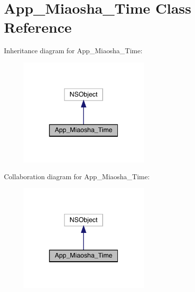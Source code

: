 \hypertarget{interface_app___miaosha___time}{}\section{App\+\_\+\+Miaosha\+\_\+\+Time Class Reference}
\label{interface_app___miaosha___time}


Inheritance diagram for App\+\_\+\+Miaosha\+\_\+\+Time\+:\nopagebreak
\begin{figure}[H]
\begin{center}
\leavevmode
\includegraphics[width=185pt]{interface_app___miaosha___time__inherit__graph}
\end{center}
\end{figure}


Collaboration diagram for App\+\_\+\+Miaosha\+\_\+\+Time\+:\nopagebreak
\begin{figure}[H]
\begin{center}
\leavevmode
\includegraphics[width=185pt]{interface_app___miaosha___time__coll__graph}
\end{center}
\end{figure}
